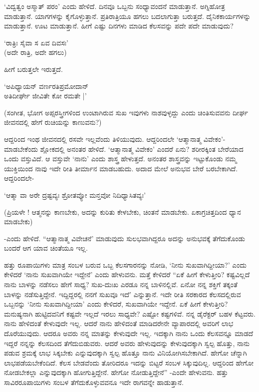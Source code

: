 `ವಿದ್ವತ್ವಂ ಅಸ್ಮಾತ್ ಪರಂ' ಎಂದು ಹೇಳಿದೆ. ದಿನವೂ ಒಬ್ಬನು ಸಂಧ್ಯಾವಂದನೆ ಮಾಡುತ್ತಾನೆ. ಅಗ್ನಿಹೋತ್ರ ಮಾಡುತ್ತಾನೆ. ಯಾಗಗಳನ್ನು ಕೈಗೊಳ್ಳುತ್ತಾನೆ. ಪ್ರತಿರಾತ್ರಿಯೂ ಹಗಲು ಬದಲಾಗುತ್ತಾ ಬರುತ್ತದೆ. ದೈನಿಕಕಾರ್ಯಗಳನ್ನು ಮಾಡುತ್ತಾನೆ. ಊಟ ಮಾಡುತ್ತಾನೆ. ಹೀಗೆ ಎಷ್ಟು ದಿನಗಳು ಮಾಡಿದ ಕೆಲಸವನ್ನು ಪದೇ ಪದೇ ಮಾಡುವುದು?

\begin{shloka}
`ರಾತ್ರಿಃ ಸೈವಾ ಸ ಏವ ದಿವಸಃ'\\
(ಅದೇ ರಾತ್ರಿ, ಅದೇ ಹಗಲು)
\end{shloka}

ಹೀಗೆ ಬರುತ್ತಲೇ ಇರುತ್ತದೆ.

\begin{shloka}
`ಅಪಿಧ್ಯಾಯನ್ ವರ್ಣರತಿಪ್ರಮೋದಾನ್\\
ಅತಿದೀರ್ಘೇ ಜೀವಿತೇ ಕೋ ರಮತೇ |'
\end{shloka}

(ಸಂಗೀತ, ಭೋಗ ಅಪ್ಸರಸ್ತ್ರೀಗಳಿಂದ ಉಂಟಾಗಿರುವ ಸುಖ ಇವುಗಳು ನಾಶವುಳ್ಳದ್ದು ಎಂದು ಚಿಂತಿಸುವವನು ದೀರ್ಘ ಜೀವನದಲ್ಲಿ ಹೇಗೆ ರುಚಿಯನ್ನು ಕಾಣುವನು?)

ಆದ್ದರಿಂದ ಇಂಥ ಜೀವನದಲ್ಲಿ ರಸವೇ ಇಲ್ಲವೆಂದು ತಿಳಿಯುವುದು. ಆದ್ದರಿಂದಲೇ `ಆತ್ಮಾನಾತ್ಮ ವಿವೇಕಂ'-ಮಾಡಬೇಕೆಂದು ಶ್ಲೋಕದಲ್ಲಿ ಅನಂತರ ಹೇಳಿದೆ. `ಆತ್ಮಾನಾತ್ಮ ವಿವೇಕಂ' ಎಂದರೆ ಏನು? ಶರೀರಕ್ಕಿಂತ ಬೇರೆಯಾದ ಒಂದು ವಸ್ತುವಿದೆ. ಆ ವಸ್ತುವೇ `ನಾನು' ಎಂದು ಶಾಸ್ತ್ರ ಹೇಳುತ್ತದೆ. ಅನಂತರ ಶಾಸ್ತ್ರವನ್ನು ಇಟ್ಟುಕೊಂಡು ನಮ್ಮ ಯುಕ್ತಿಯಿಂದ ನಾವು ಇದೇ ರೀತಿ ತೀರ್ಮಾನ ಮಾಡಬಹುದು. ಅದಾದ ಮೇಲೆ ಅನುಭವ ಬೇರೆ ಬರಬೇಕಾಗಿದೆ. ಆದ್ದರಿಂದಲೇ-

\begin{shloka}
`ಆತ್ಮಾ ವಾ ಅರೇ ದ್ರಷ್ಟವ್ಯಃ ಶ್ರೋತವ್ಯೋ ಮನ್ತವೋ ನಿದಿಧ್ಯಾಸಿತವ್ಯಃ'
\end{shloka}

(ಪ್ರಿಯಳೇ ! ಆತ್ಮನನ್ನು ಕಾಣಬೇಕು, ಅದನ್ನು ಕುರಿತು ಕೇಳಬೇಕು, ಚಿಂತನೆ ಮಾಡಬೇಕು. ಏಕಾಗ್ರಚಿತ್ತದಿಂದ ಧ್ಯಾನ ಮಾಡಬೇಕು)

-ಎಂದು ಹೇಳಿದೆ. ``ಆತ್ಮಾನಾತ್ಮ ವಿವೇಚನೆ' ಮಾಡುವುದು ಸುಲಭವಾಗಿದ್ದರೂ ಅದನ್ನು ಅನುಭವಕ್ಕೆ ತೆಗೆದುಕೊಂಡು ಬಂದರೆ ಆಗ ಯಾವ ಚಿಂತೆಯೂ ಇಲ್ಲ.

ಹತ್ತು ರೂಪಾಯಿಗಳು ಮಾತ್ರ ಸಂಬಳ ಬರುವ ಒಬ್ಬ ಕೆಲಸಗಾರನನ್ನು ನೋಡಿ, `ನೀನು ಸುಖವಾಗಿದ್ದೀಯಾ?' ಎಂದು ಕೇಳಿದರೆ `ನಾನು ಸುಖವಾಗಿಯೇ ಇದ್ದೇನೆ' ಎಂದು ಹೇಳುವನು. ಮತ್ತೆ ಕೇಳಿದರೆ ``ಏಕೆ ಹೀಗೆ ಕೇಳುತ್ತೀರಿ? ಕಷ್ಟವಿಲ್ಲದೆ ನಾನು ಬಾಳನ್ನು ನಡೆಸಲು ಹೇಗೆ ಸಾಧ್ಯ? ಸುಖ-ದುಃಖ ಎರಡೂ ನನ್ನ ಬಾಳಿನಲ್ಲಿವೆ. ಏನೋ ನನ್ನ ಶಕ್ತಿಗೆ ತಕ್ಕಂತೆ ಬಾಳನ್ನು ನಡೆಸುತ್ತಿದ್ದೇನೆ. ಇದ್ದಿದ್ದರಲ್ಲಿ ನನಗೆ ಸುಖವೂ ಇದೆ' ಎನ್ನುತ್ತಾನೆ. ಇದೇ ರೀತಿ ಸರಕಾರದ ಕೆಲಸದಲ್ಲಿರುವ ಒಬ್ಬನನ್ನು `ನೀನು ಸುಖವಾಗಿದ್ದೀಯಾ' ಎಂದು ಕೇಳಿದರೆ, ಸುಖವಾಗಿಯೇ ಇದ್ದೇನೆ. ಏಕೆ ಹೀಗೆ ಕೇಳುತ್ತೀರಿ? ಮನುಷ್ಯನಾಗಿ ಹುಟ್ಟಿದವನಿಗೆ ಕಷ್ಟವೇ ಇಲ್ಲದೆ ಇರಲು ಸಾಧ್ಯವೇ? ಎಷ್ಟೋ ಕಷ್ಟಗಳಿವೆ. ನನ್ನ ಡೈರೆಕ್ಟರ್ ಬಹಳ ಕೆಟ್ಟವರು. ನಾನು ಹೇಳಿದಂತೆ ಕೇಳುವುದೇ ಇಲ್ಲ. ಆದರೆ ನಾನು ಹೇಳಿದಂತೆ ಮಾಡಿದರೇನೇ ವ್ಯಾಪಾರದಲ್ಲಿ ಅವರಿಗೆ ಲಾಭ ದೊರೆಯುವುದು. ಆದರೂ ಅವರು ನನ್ನ ಮಾತನ್ನು ಕೇಳುವುದೇ ಇಲ್ಲ. ಇದಕ್ಕಾಗಿ ನಾನು ಒಂದು ಕೆಲಸವನ್ನೂ ಮಾಡದೆ ಇದ್ದರೆ ನನ್ನನ್ನು ಕೆಲಸದಿಂದ ತೆಗೆದುಬಿಡುವರು. ಆದರೆ ಅವರು ಹೇಳುವುದನ್ನು ಕೇಳುವುದಕ್ಕಾಗಿ ಸ್ವಲ್ಪ ಹೊತ್ತು, ನಾನು ಪಡುವ ಶ್ರಮಕ್ಕೆ ಲಾಭ ಸಿಕ್ಕಬೇಕು ಎನ್ನುವುದಕ್ಕಾಗಿ ಸ್ವಲ್ಪ ಹೊತ್ತೂ ನಾನು ವಿನಿಯೋಗಿಸಬೇಕಾಗಿದೆ. ಹೇಗೋ ಚೆನ್ನಾಗಿ ಲಾಭಪಡೆಯಬೇಕೆಂದಿದೆ. ಕೆಲಸ ಬೇಡವೆಂದು ತೋರಿದರೂ ಇದನ್ನು ಬಿಟ್ಟರೆ ಸಂಬಳ ಸಿಕ್ಕುವುದಿಲ್ಲ. ಆದ್ದರಿಂದ ಹೇಗೋ ನೋಡಬೇಕಲ್ಲಾ ಎನ್ನುವುದಕ್ಕಾಗಿ ಹೋಗುತ್ತಿದ್ದೇನೆ. ಹೇಗೋ ನೋಡುತ್ತಿದ್ದೇನೆ'' -ಎಂದೇ ಹೇಳುವನು. ಹತ್ತು ಸಾವಿರರೂಪಾಯಿಗಳು ಸಂಬಳ ತೆಗೆದುಕೊಳ್ಳುವವನೂ ಇದೇ ರಾಗವನ್ನೇ ಹಾಡುತ್ತಾನೆ.


